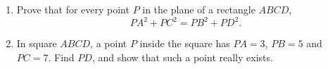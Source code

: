 \begin{enumerate}
\item[(a)] Prove that for every point $P$ in the plane of a rectangle $ABCD$,
\[PA^2+PC^2=PB^2+PD^2.\]
\item[(b)] In square $ABCD$, a point $P$ inside the square has $PA=3$, $PB=5$ and $PC=7$. Find $PD$, and show that such a point really exists.
\end{enumerate}
